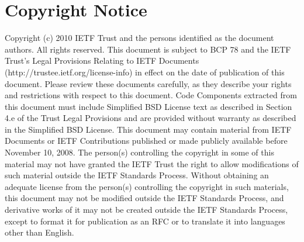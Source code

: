 \section*{Copyright Notice}

Copyright (c) 2010 IETF Trust and the persons identified as the
document authors. All rights reserved.
This document is subject to BCP 78 and the IETF Trust's Legal
Provisions Relating to IETF Documents
(http://trustee.ietf.org/license-info) in effect on the date of
publication of this document. Please review these documents
carefully, as they describe your rights and restrictions with respect
to this document. Code Components extracted from this document must
include Simplified BSD License text as described in Section 4.e of
the Trust Legal Provisions and are provided without warranty as
described in the Simplified BSD License.
This document may contain material from IETF Documents or IETF
Contributions published or made publicly available before November
10, 2008. The person(s) controlling the copyright in some of this
material may not have granted the IETF Trust the right to allow
modifications of such material outside the IETF Standards Process.
Without obtaining an adequate license from the person(s) controlling
the copyright in such materials, this document may not be modified
outside the IETF Standards Process, and derivative works of it may
not be created outside the IETF Standards Process, except to format
it for publication as an RFC or to translate it into languages other
than English.
